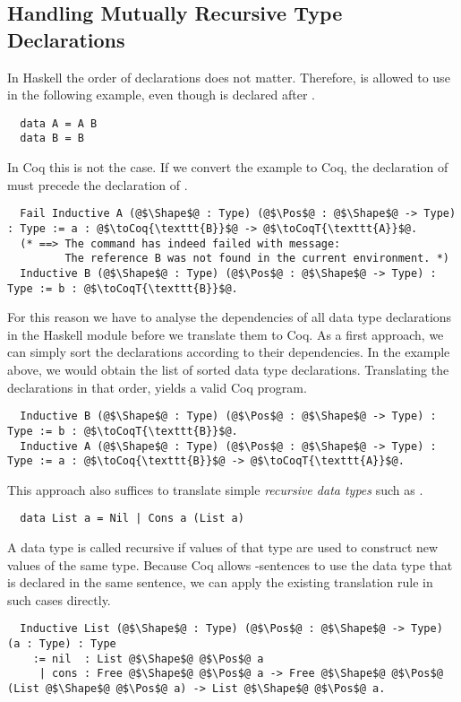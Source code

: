 \subsection{Handling Mutually Recursive Type Declarations}
In Haskell the order of declarations does not matter.
Therefore,  is allowed to use  in the following example, even though  is declared after .
\begin{verbatim}
  data A = A B
  data B = B
\end{verbatim}
In Coq this is not the case.
If we convert the example to Coq, the declaration of  must precede the declaration of .
\begin{verbatim}
  Fail Inductive A (@$\Shape$@ : Type) (@$\Pos$@ : @$\Shape$@ -> Type) : Type := a : @$\toCoq{\texttt{B}}$@ -> @$\toCoqT{\texttt{A}}$@.
  (* ==> The command has indeed failed with message:
         The reference B was not found in the current environment. *)
  Inductive B (@$\Shape$@ : Type) (@$\Pos$@ : @$\Shape$@ -> Type) : Type := b : @$\toCoqT{\texttt{B}}$@.
\end{verbatim}
For this reason we have to analyse the dependencies of all data type declarations in the Haskell module before we translate them to Coq.
As a first approach, we can simply sort the declarations according to their dependencies.
In the example above, we would obtain the list \haskell{[B, A]} of sorted data type declarations.
Translating the declarations in that order, yields a valid Coq program.
\begin{verbatim}
  Inductive B (@$\Shape$@ : Type) (@$\Pos$@ : @$\Shape$@ -> Type) : Type := b : @$\toCoqT{\texttt{B}}$@.
  Inductive A (@$\Shape$@ : Type) (@$\Pos$@ : @$\Shape$@ -> Type) : Type := a : @$\toCoq{\texttt{B}}$@ -> @$\toCoqT{\texttt{A}}$@.
\end{verbatim}

This approach also suffices to translate simple \textit{recursive data types} such as .
\begin{verbatim}
  data List a = Nil | Cons a (List a)
\end{verbatim}
A data type is called recursive if values of that type are used to construct new values of the same type.
Because Coq allows -sentences to use the data type that is declared in the same sentence, we can apply the existing translation rule in such cases directly.
\begin{verbatim}
  Inductive List (@$\Shape$@ : Type) (@$\Pos$@ : @$\Shape$@ -> Type) (a : Type) : Type
    := nil  : List @$\Shape$@ @$\Pos$@ a
     | cons : Free @$\Shape$@ @$\Pos$@ a -> Free @$\Shape$@ @$\Pos$@ (List @$\Shape$@ @$\Pos$@ a) -> List @$\Shape$@ @$\Pos$@ a.
\end{verbatim}

